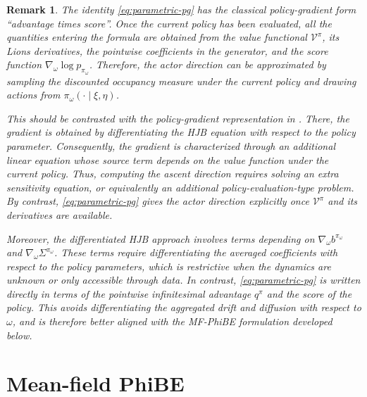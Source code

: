 \documentclass[a4paper, 10pt, english, reqno]{amsart}
\newtheorem{remark}[theorem]{Remark}
\begin{document}
\begin{remark}
\label{rem:parametric-policy-gradient-comparison}
The identity \eqref{eq:parametric-pg} has the classical policy-gradient form ``advantage times score''. Once the current policy has been evaluated, all the quantities entering the formula are obtained from the value functional $\mathcal V^\pi$, its Lions derivatives, the pointwise coefficients in the generator, and the score function $\nabla_\omega\log p_{\pi_\omega}$. Therefore, the actor direction can be approximated by sampling the discounted occupancy measure under the current policy and drawing actions from $\pi_\omega(\cdot\mid\xi,\eta)$.

This should be contrasted with the policy-gradient representation in \cite{frikhaActorCritic}. There, the gradient is obtained by differentiating the HJB equation with respect to the policy parameter. Consequently, the gradient is characterized through an additional linear equation whose source term depends on the value function under the current policy. Thus, computing the ascent direction requires solving an extra sensitivity equation, or equivalently an additional policy-evaluation-type problem. By contrast, \eqref{eq:parametric-pg} gives the actor direction explicitly once $\mathcal V^\pi$ and its derivatives are available.

Moreover, the differentiated HJB approach involves terms depending on $\nabla_\omega b^{\pi_\omega}$ and $\nabla_\omega\Sigma^{\pi_\omega}$. These terms require differentiating the averaged coefficients with respect to the policy parameters, which is restrictive when the dynamics are unknown or only accessible through data. In contrast, \eqref{eq:parametric-pg} is written directly in terms of the pointwise infinitesimal advantage $q^\pi$ and the score of the policy. This avoids differentiating the aggregated drift and diffusion with respect to $\omega$, and is therefore better aligned with the MF-PhiBE formulation developed below.
\end{remark}




\section{Mean-field PhiBE}
\label{sec:MF-phibe}
\end{document}
